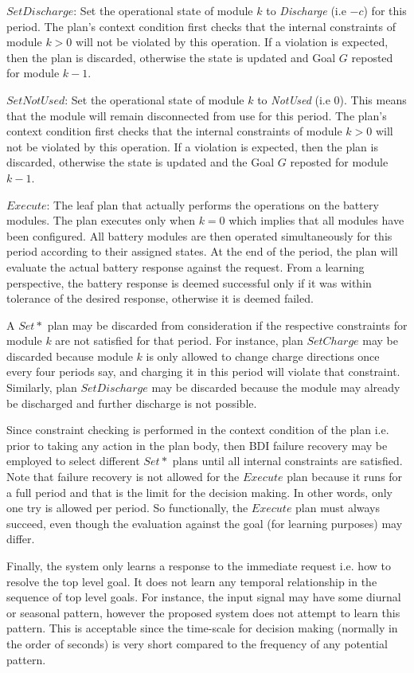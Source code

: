 $SetDischarge$: Set the operational state of module $k$ to {\em Discharge} (i.e $-c$) for this period. The plan's context condition first checks that the internal constraints of module $k>0$ will not be violated by this operation. If a violation is expected, then the plan is discarded, otherwise the state is updated and Goal $G$ reposted for module $k-1$.

$SetNotUsed$: Set the operational state of module $k$ to {\em NotUsed} (i.e $0$). This means that the module will remain disconnected from use for this period. The plan's context condition first checks that the internal constraints of module $k>0$ will not be violated by this operation. If a violation is expected, then the plan is discarded, otherwise the state is updated and the Goal $G$ reposted for module $k-1$.

$Execute$: The leaf plan that actually performs the operations on the battery modules. The plan executes only when $k=0$ which implies that all modules have been configured. All battery modules are then operated simultaneously for this period according to their assigned states. At the end of the period, the plan will evaluate the actual battery response against the request. From a learning perspective, the battery response is deemed successful only if it was within tolerance of the desired response, otherwise it is deemed failed.

A $Set*$ plan may be discarded from consideration if the respective constraints for module $k$ are not satisfied for that period. For instance, plan $SetCharge$ may be discarded because module $k$ is only allowed to change charge directions once every four periods say, and charging it in this period will violate that constraint. Similarly, plan $SetDischarge$ may be discarded because the module may already be discharged and further discharge is not possible. 

Since constraint checking is performed in the context condition of the plan i.e. prior to taking any action in the plan body, then BDI failure recovery may be employed to select different $Set*$ plans until all internal constraints are satisfied. Note that failure recovery is not allowed for the $Execute$ plan because it runs for a full period and that is the limit for the decision making. In other words, only one try is allowed per period. So functionally, the $Execute$ plan must always succeed, even though the evaluation against the goal (for learning purposes) may differ.

Finally, the system only learns a response to the immediate request i.e. how to resolve the top level goal. It does not learn any temporal relationship in the sequence of top level goals. For instance, the input signal may have some diurnal or seasonal pattern, however the proposed system does not attempt to learn this pattern. This is acceptable since the time-scale for decision making (normally in the order of seconds) is very short compared to the frequency of any potential pattern.

